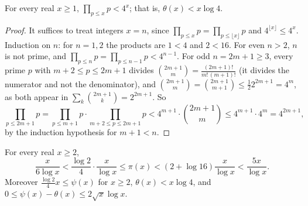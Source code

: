 \begin{lemma}[Erd\H{o}s]\label{prime-numbers:lemma-primorial}
For every real $x \geq 1$, $\prod_{p \leq x}p < 4^x$; that is, $\theta(x) < x\log 4$.
\end{lemma}

\begin{proof}
It suffices to treat integers $x = n$, since $\prod_{p \leq x}p = \prod_{p \leq \lfloor x\rfloor}p$ and $4^{\lfloor x\rfloor} \leq 4^x$. Induction on $n$: for $n = 1, 2$ the products are $1 < 4$
and $2 < 16$. For even $n > 2$, $n$ is not prime, and $\prod_{p \leq n}p = \prod_{p \leq n-1}p < 4^{n-1}$. For odd $n = 2m + 1 \geq 3$, every prime $p$ with $m + 2 \leq p \leq 2m + 1$ divides
$\binom{2m+1}{m} = \frac{(2m + 1)!}{m!\,(m + 1)!}$ (it divides the numerator and not the denominator), and $\binom{2m+1}{m} = \binom{2m+1}{m+1} \leq \frac12 2^{2m+1} = 4^m$, as both appear in
$\sum_k\binom{2m+1}{k} = 2^{2m+1}$. So
\[
\prod_{p \leq 2m+1}p = \prod_{p \leq m+1}p \cdot \prod_{m+2 \leq p \leq 2m+1}p < 4^{m+1} \cdot \binom{2m + 1}{m} \leq 4^{m+1} \cdot 4^m = 4^{2m+1},
\]
by the induction hypothesis for $m + 1 < n$.
\end{proof}

\begin{theorem}[Chebyshev]\label{prime-numbers:theorem-chebyshev}
For every real $x \geq 2$,
\[
\frac{x}{6\log x} < \frac{\log 2}{4}\cdot\frac{x}{\log x} \leq \pi(x) < (2 + \log 16)\frac{x}{\log x} < \frac{5x}{\log x}.
\]
Moreover $\frac{\log 2}{4}x \leq \psi(x)$ for $x \geq 2$, $\theta(x) < x\log 4$, and $0 \leq \psi(x) - \theta(x) \leq 2\sqrt{x}\log x$.
\end{theorem}

